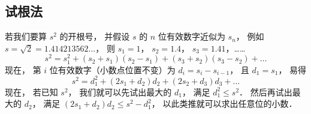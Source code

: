 
\subsection{试根法}

若我们要算 $s^2$ 的开根号， 并假设 $s$ 的 $n$ 位有效数字近似为 $s_n$， 例如 $s = \sqrt{2} = 1.414213562\dots$， 则 $s_1 = 1$， $s_2=1.4$， $s_3=1.41$，……
\begin{equation}
s^2 = s_1^2 + (s_2+s_1)(s_2-s_1) + (s_3+s_2)(s_3-s_2) + \dots
\end{equation}
现在， 第 $i$ 位有效数字（小数点位置不变）为 $d_i = s_i-s_{i-1}$， 且 $d_1 = s_1$， 易得
\begin{equation}
s^2 = d_1^2 + (2s_1 + d_2)d_2 + (2s_2 + d_3)d_3 + \dots
\end{equation}
现在， 若已知 $s^2$， 我们就可以先试出最大的 $d_1$， 满足 $d_1^2\leqslant s^2$． 然后再试出最大的 $d_2$， 满足 $(2s_1 + d_2)d_2 \leqslant s^2 - d_1^2$， 以此类推就可以求出任意位的小数．

